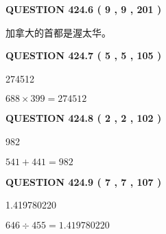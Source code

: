 \documentclass{ctexart}
\begin{document}
{\textbf{\Large{QUESTION
424.6 
 ( 9 , 9 , 201 )
}}}
  
  
 
 
\noindent{}
 
 
加拿大的首都是渥太华。
 
 
 
 
  
\vspace{0.2in}
  
{\textbf{\Large{QUESTION
424.7 
 ( 5 , 5 , 105 )
}}}
  
  
 
 
\noindent{}

274512
 
 
 
 
\noindent{}

$ %
688 \times  %
399=   %
274512$
 
 
  
\vspace{0.2in}
  
{\textbf{\Large{QUESTION
424.8 
 ( 2 , 2 , 102 )
}}}
  
  
 
 
\noindent{}

982
 
 
 
 
\noindent{}

$ %
541 +  %
441=   %
982$
 
 
  
\vspace{0.2in}
  
{\textbf{\Large{QUESTION
424.9 
 ( 7 , 7 , 107 )
}}}
  
  
 
 
\noindent{}

1.419780220
 
 
 
 
\noindent{}

$ %
646 \div  %
455=   %
1.419780220$
 
\end{document}
